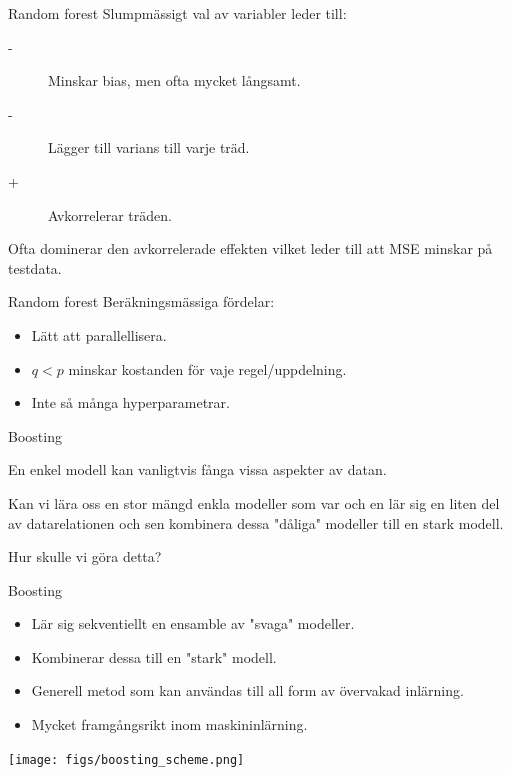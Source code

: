 \documentclass[10pt,english]{beamer}
\begin{document}
\begin{frame}{Random forest}
    Slumpmässigt val av variabler leder till:
    \begin{description}
        \item[-] Minskar bias, men ofta mycket långsamt.
        \item[-] Lägger till varians till varje träd.
        \item[+] Avkorrelerar träden.
    \end{description}
    Ofta dominerar den avkorrelerade effekten vilket leder till att MSE minskar på testdata.
\end{frame}

\begin{frame}{Random forest}
    Beräkningsmässiga fördelar:
    \begin{itemize}
        \item Lätt att parallellisera.
        \item $q <  p$ minskar kostanden för vaje regel/uppdelning.
        \item Inte så många hyperparametrar.
    \end{itemize}
\end{frame}

\begin{frame}{Boosting}
    
    En enkel modell kan vanligtvis fånga vissa aspekter av datan.

    Kan vi lära oss en stor mängd enkla modeller som var och en lär sig en liten del av datarelationen och sen kombinera dessa "dåliga" modeller till en stark modell.

    Hur skulle vi göra detta?

\end{frame}

\begin{frame}{Boosting}
    \begin{itemize}
        \item Lär sig sekventiellt en ensamble av "svaga" modeller.
        \item Kombinerar dessa till en "stark" modell.
        \item Generell metod som kan användas till all form av övervakad inlärning.
        \item Mycket framgångsrikt inom maskininlärning.
    \end{itemize}

    \texttt{[image: figs/boosting\_scheme.png]}
\end{frame}
\end{document}
